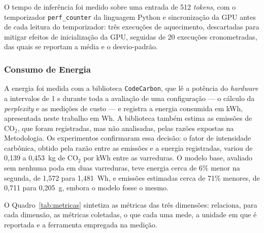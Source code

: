 O tempo de inferência foi medido sobre uma entrada de 512 \textit{tokens}, com o temporizador
\texttt{perf\_counter} da linguagem Python e sincronização da GPU antes de cada leitura do
temporizador: três execuções de aquecimento, descartadas para mitigar efeitos de
inicialização da GPU, seguidas de 20 execuções cronometradas, das quais se reportam a média e
o desvio-padrão.

\subsubsection{Consumo de Energia}\label{subsec:metrica_energia}

A energia foi medida com a biblioteca \texttt{CodeCarbon}, que lê a potência do
\textit{hardware} a intervalos de 1 s durante toda a avaliação de uma configuração --- o
cálculo da \textit{perplexity} e as medições de custo --- e registra a energia consumida em
kWh, apresentada neste trabalho em Wh. A biblioteca também estima as emissões de
$\text{CO}_2$, que foram registradas, mas não analisadas, pelas razões expostas na
Metodologia. Os experimentos confirmaram essa decisão: o fator de
intensidade carbônica, obtido pela razão entre as emissões e a energia registradas, variou de
0,139 a 0,453~kg de $\text{CO}_2$ por kWh entre as varreduras. O modelo base, avaliado sem
nenhuma poda em duas varreduras, teve energia cerca de 6\% menor na segunda, de 1,572 para
1,481~Wh, e emissões estimadas cerca de 71\% menores, de 0,711 para 0,205~g, embora o modelo
fosse o mesmo.

O Quadro~\ref{tab:metricas} sintetiza as métricas das três dimensões:
relaciona, para cada dimensão, as métricas coletadas, o que cada
uma mede, a unidade em que é reportada e a ferramenta empregada na medição.

